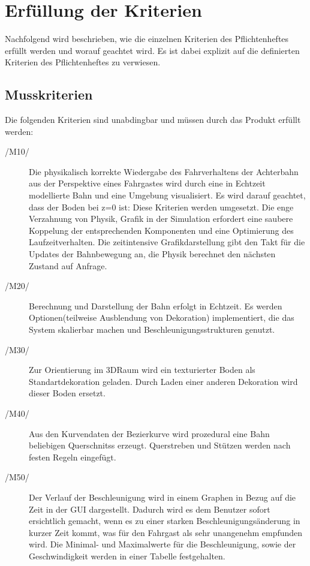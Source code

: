 \chapter{Erfüllung der Kriterien}

Nachfolgend wird beschrieben, wie die einzelnen Kriterien des Pflichtenheftes
erfüllt werden und worauf geachtet wird.  Es ist dabei explizit auf die
definierten Kriterien des Pflichtenheftes zu verwiesen.
\section{Musskriterien}

Die folgenden Kriterien sind unabdingbar und müssen durch das Produkt erfüllt
werden:
\begin{description}
	\item[/M10/] Die physikalisch korrekte Wiedergabe des Fahrverhaltens der Achterbahn aus der Perspektive eines Fahrgastes wird durch eine in Echtzeit modellierte Bahn und eine Umgebung visualisiert. Es wird darauf geachtet, dass der Boden bei z=0 ist: Diese Kriterien werden umgesetzt. Die enge Verzahnung von Physik, Grafik in der Simulation erfordert eine saubere Koppelung der entsprechenden Komponenten und
eine Optimierung des Laufzeitverhalten. Die zeitintensive Grafikdarstellung gibt den Takt für die Updates der Bahnbewegung an, die Physik berechnet den nächsten Zustand auf Anfrage.
	\item[/M20/] Berechnung und Darstellung der Bahn erfolgt in Echtzeit. Es werden Optionen(teilweise Ausblendung von Dekoration) implementiert, die das System skalierbar machen und Beschleunigungsstrukturen genutzt.
	\item[/M30/] Zur Orientierung im 3DRaum wird ein texturierter Boden als Standartdekoration geladen. Durch Laden einer anderen Dekoration wird dieser Boden ersetzt.
	\item[/M40/] Aus den Kurvendaten der Bezierkurve wird prozedural eine Bahn beliebigen Querschnitss erzeugt. Querstreben und Stützen werden nach festen Regeln eingefügt.
	\item[/M50/] Der Verlauf der Beschleunigung wird in einem Graphen in Bezug auf die Zeit in der GUI dargestellt. Dadurch wird es dem Benutzer sofort ersichtlich gemacht, wenn es zu einer starken Beschleunigungsänderung in kurzer Zeit kommt, was für den Fahrgast als sehr unangenehm empfunden wird. Die Minimal- und Maximalwerte für die Beschleunigung, sowie der Geschwindigkeit werden in einer Tabelle festgehalten.
\end{description}

